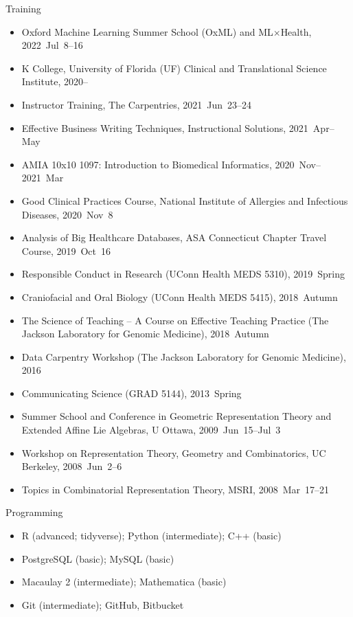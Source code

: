 \documentclass[10pt,a4paper]{article}
\begin{document}
\vspace{.25cm}
{\sc Training}
\begin{itemize}[label=$\circ$,nolistsep]
\item
Oxford Machine Learning Summer School (OxML) and ML$\times$Health, 2022~Jul~8--16
\item
K College, University of Florida (UF) Clinical and Translational Science Institute, 2020--
\item
Instructor Training, The Carpentries, 2021~Jun~23--24
\item
Effective Business Writing Techniques, Instructional Solutions, 2021~Apr--May
\item
AMIA 10x10 1097: Introduction to Biomedical Informatics, 2020~Nov--2021~Mar
\item
Good Clinical Practices Course, National Institute of Allergies and Infectious Diseases, 2020~Nov~8
\item
Analysis of Big Healthcare Databases, ASA Connecticut Chapter Travel Course, 2019~Oct~16
\item
Responsible Conduct in Research (UConn Health MEDS 5310), 2019~Spring
\item
Craniofacial and Oral Biology (UConn Health MEDS 5415), 2018~Autumn
\item
The Science of Teaching -- A Course on Effective Teaching Practice (The Jackson Laboratory for Genomic Medicine), 2018~Autumn
\item
Data Carpentry Workshop (The Jackson Laboratory for Genomic Medicine), 2016
\item
Communicating Science (GRAD 5144), 2013~Spring
\item
Summer School and Conference in Geometric Representation Theory and Extended Affine Lie Algebras, U Ottawa, 2009~Jun~15--Jul~3
\item
Workshop on Representation Theory, Geometry and Combinatorics, UC Berkeley, 2008~Jun~2--6
\item
Topics in Combinatorial Representation Theory, MSRI, 2008~Mar~17--21
\end{itemize}
%
\vspace{.25cm}
{\sc Programming}
\begin{itemize}[label=$\circ$,nolistsep]
\item R (advanced; tidyverse); Python (intermediate); C++ (basic)
\item PostgreSQL (basic); MySQL (basic)
\item Macaulay 2 (intermediate); Mathematica (basic)
\item Git (intermediate); GitHub, Bitbucket
\end{itemize}
\end{document}
